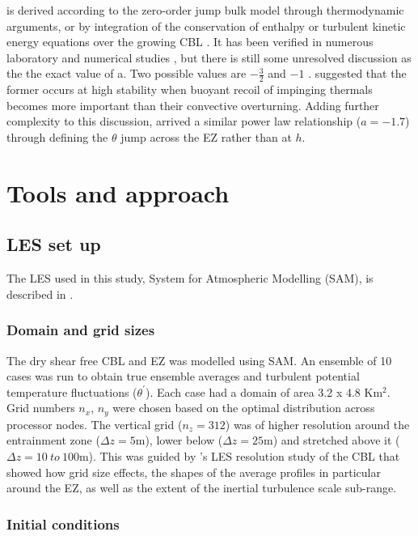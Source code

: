 is derived according to the zero-order jump bulk model through thermodynamic arguments, or by integration of the conservation of enthalpy or turbulent kinetic energy equations over the growing CBL \citep{Tennekes73, Deardorff79, FedConzMir04}. It has been verified in numerous laboratory and numerical studies \citep{DearWill80, SullMoengStev, FedConzMir04, BrooksFowler2}, but there is still some unresolved discussion as the the exact value of a.  Two possible values are $-\frac{3}{2}$ and $-1$ \citep{Traum11}.  \cite{Turner86} suggested that the former occurs at high stability when buoyant recoil of impinging thermals becomes more important than their convective overturning.  Adding further complexity to this discussion, \cite{FedConzMir04} arrived a similar power law relationship ($a = -1.7$) through defining the $\theta$ jump across the EZ rather than at $h$.\\

\section{Tools and approach}

\subsection{LES set up}

The LES used in this study, System for Atmospheric Modelling (SAM), is described in \cite{KhairRand}.

\subsubsection{Domain and grid sizes}
The dry shear free CBL and EZ was modelled using SAM.  An ensemble of 10 cases was run to obtain true ensemble averages and turbulent potential temperature fluctuations ($\theta^{'}$). Each case had a domain of area 3.2 x 4.8 Km$^{2}$.  Grid numbers $n_{x}$, $n_{y}$ were chosen based on the optimal distribution across processor nodes. The vertical grid ($n_{z}=312$) was of higher resolution around the entrainment zone ($\Delta z = 5$m), lower below ($\Delta z = 25$m) and stretched above it ($\Delta z = 10 \ to \ 100 $m). This was guided by \cite{SullPat}'s LES resolution study of the CBL that showed how grid size effects, the shapes of the average profiles in particular around the EZ, as well as the extent of the inertial turbulence scale sub-range.\\

\subsubsection{Initial conditions}

